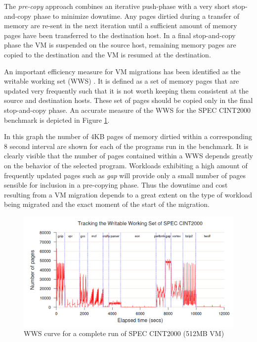 The \textit{pre-copy} approach combines an iterative push-phase with a very short stop-and-copy phase to minimize downtime. Any pages dirtied during a transfer of memory are re-sent in the next iteration until a sufficient amount of memory pages have been transferred to the destination host. In a final stop-and-copy phase the VM is suspended on the source host, remaining memory pages are copied to the destination and the VM is resumed at the destination. 

An important efficiency measure for VM migrations has been identified as the writable working set (WWS) \cite{clark2005live}. It is defined as a set of memory pages that are updated very frequently such that it is not worth keeping them consistent at the source and destination hosts. These set of pages should be copied only in the final stop-and-copy phase. An accurate measure of the WWS for the SPEC CINT2000 benchmark is depicted in Figure \ref{fig:tracking_writable_working_set}. 

In this graph the number of 4KB pages of memory dirtied within a corresponding 8 second interval are shown for each of the programs run in the benchmark. 
It is clearly visible that the number of pages contained within a WWS depends greatly on the behavior of the selected program. Workloads exhibiting a high amount of frequently updated pages such as \textit{gap} will provide only a small number of pages sensible for inclusion in a pre-copying phase. 
Thus the downtime and cost resulting from a VM migration depends to a great extent on the type of workload being migrated and the exact moment of the start of the migration. 



\begin{figure}
	\centering
		\includegraphics[width=1.0\textwidth]{figures/state_of_the_art/tracking_writable_working_set.PNG}
	\caption{WWS curve for a complete run of SPEC CINT2000 (512MB VM) \cite{clark2005live}}
	\label{fig:tracking_writable_working_set}
\end{figure}



